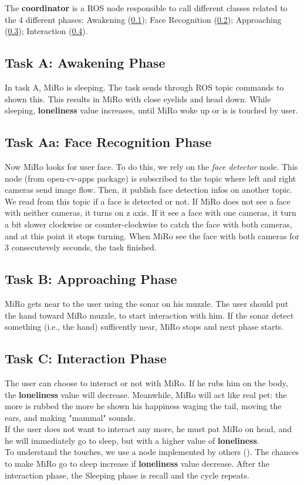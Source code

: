 \documentclass[12pt,peerreviewca, a4paper, onecolumn]{article}
\begin{document}
    \newpage
	\noindent The \textbf{coordinator} is a ROS node responsible to call different classes related to the 4 different phases: Awakening (\ref{subsec:a}); Face Recognition (\ref{subsec:aa}); Approaching (\ref{subsec:b}); Interaction (\ref{subsec:c}).
	\subsection{Task A: Awakening Phase}
	\label{subsec:a}
	In task A, MiRo is sleeping. The task sends through ROS topic commands to shown this. This results in MiRo with close eyelids and head down. While sleeping, \textbf{loneliness} value increases, until MiRo woke up or is is touched by user.
	\subsection{Task Aa: Face Recognition Phase}	\label{subsec:aa}
	Now MiRo looks for user face. To do this, we rely on the \textit{face detector} node. This node (from open-cv-apps package) is subscribed to the topic where left and right cameras send image flow. Then, it publish face detection infos on another topic. We read from this topic if a face is detected or not.
	If MiRo does not see a face with neither cameras, it turns on z axis. If it see a face with one cameras, it turn a bit slower clockwise or counter-clockwise to catch the face with both cameras, and at this point it stops turning. When MiRo see the face with both cameras for 3 consecutevely seconds, the task finished.
	\subsection{Task B: Approaching Phase}	\label{subsec:b}
	MiRo gets near to the user using the sonar on his muzzle. The user should put the hand toward MiRo muzzle, to start interaction with him. If the sonar detect something (i.e., the hand) sufficently near, MiRo stops and next phase starts.
	\subsection{Task C: Interaction Phase} 	\label{subsec:c} 
	The user can choose to interact or not with MiRo. If he rubs him on the body, the \textbf{loneliness} value will decrease. Meanwhile, MiRo will act like real pet: the more is rubbed the more he shown his happiness waging the tail, moving the ears, and making "mammal" sounds.\\
	If the user does not want to interact any more, he must pat MiRo on head, and he will immediately go to sleep, but with a higher value of \textbf{loneliness}.\\
	To understand the touches, we use a node implemented by others ().
	The chances to make MiRo go to sleep increase if \textbf{loneliness} value decrease. After the interaction phase, the Sleeping phase is recall and the cycle repeats. 
	
\end{document}
